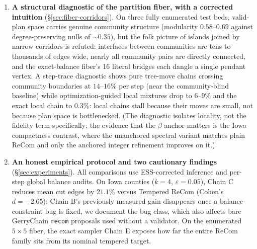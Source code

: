 \documentclass[11pt]{article}
\begin{document}
\begin{enumerate}
  \item \textbf{A structural diagnostic of the partition fiber, with
    a corrected intuition} (\S\ref{sec:fiber-corridors}). On three
    fully enumerated test beds, valid-plan space carries genuine
    community structure (modularity $0.58$--$0.69$ against
    degree-preserving nulls of $\sim 0.35$), but the folk picture of
    islands joined by narrow corridors is refuted: interfaces between
    communities are tens to thousands of edges wide, nearly all
    community pairs are directly connected, and the exact-balance
    fiber's 16 literal bridges each dangle a single pendant vertex.
    A step-trace diagnostic shows pure tree-move chains crossing
    community boundaries at $14$--$16\%$ per step (near the
    community-blind baseline) while optimization-guided local
    mixtures drop to $6$--$9\%$ and the exact local chain to
    $0.3\%$: local chains stall because their moves are small, not
    because plan space is bottlenecked. (The diagnostic isolates
    locality, not the fidelity term specifically; the evidence that
    the $\beta$ anchor matters is the Iowa compactness contrast,
    where the unanchored spectral variant matches plain ReCom and
    only the anchored integer refinement improves on it.)

  \item \textbf{An honest empirical protocol and two cautionary
    findings} (\S\ref{sec:experiments}). All comparisons use
    ESS-corrected inference and per-step global balance audits. On
    Iowa counties ($k = 4$, $\varepsilon = 0.05$), Chain C reduces
    mean cut edges by $21.1\%$ versus Tempered ReCom (Cohen's
    $d = -2.65$); Chain B's previously measured gain disappears once
    a balance-constraint bug is fixed, we document the bug class,
    which also affects bare GerryChain \texttt{recom} proposals used
    without a validator. On the enumerated $5 \times 5$ fiber, the
    exact sampler Chain E exposes how far the entire ReCom family
    sits from its nominal tempered target.
\end{enumerate}
\end{document}
